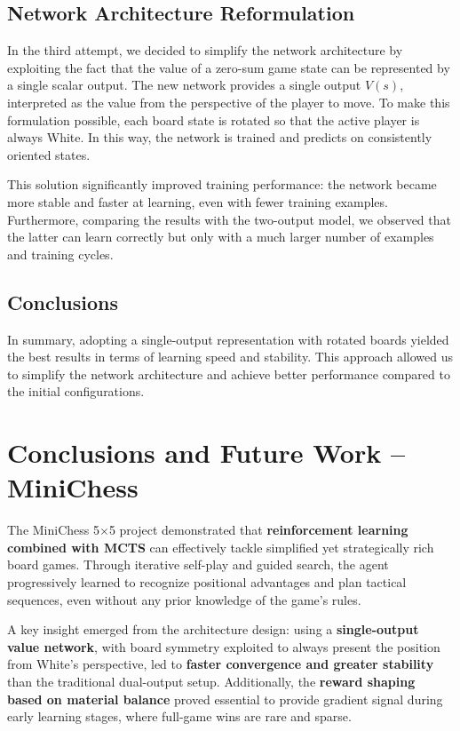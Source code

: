 \documentclass{report}
\begin{document}
\section{Network Architecture Reformulation}
In the third attempt, we decided to simplify the network architecture by exploiting the fact that the value of a zero-sum game state can be represented by a single scalar output. The new network provides a single output $V(s)$, interpreted as the value from the perspective of the player to move. To make this formulation possible, each board state is rotated so that the active player is always White. In this way, the network is trained and predicts on consistently oriented states.

This solution significantly improved training performance: the network became more stable and faster at learning, even with fewer training examples. Furthermore, comparing the results with the two-output model, we observed that the latter can learn correctly but only with a much larger number of examples and training cycles.

\section{Conclusions}
In summary, adopting a single-output representation with rotated boards yielded the best results in terms of learning speed and stability. This approach allowed us to simplify the network architecture and achieve better performance compared to the initial configurations.
\chapter{Conclusions and Future Work – MiniChess}
 
The MiniChess 5$\times$5 project demonstrated that \textbf{reinforcement learning combined with MCTS} can effectively tackle simplified yet strategically rich board games.  
Through iterative self-play and guided search, the agent progressively learned to recognize positional advantages and plan tactical sequences, even without any prior knowledge of the game’s rules.
 
A key insight emerged from the architecture design: using a \textbf{single-output value network}, with board symmetry exploited to always present the position from White's perspective, led to \textbf{faster convergence and greater stability} than the traditional dual-output setup.  
Additionally, the \textbf{reward shaping based on material balance} proved essential to provide gradient signal during early learning stages, where full-game wins are rare and sparse.
 
\end{document}
